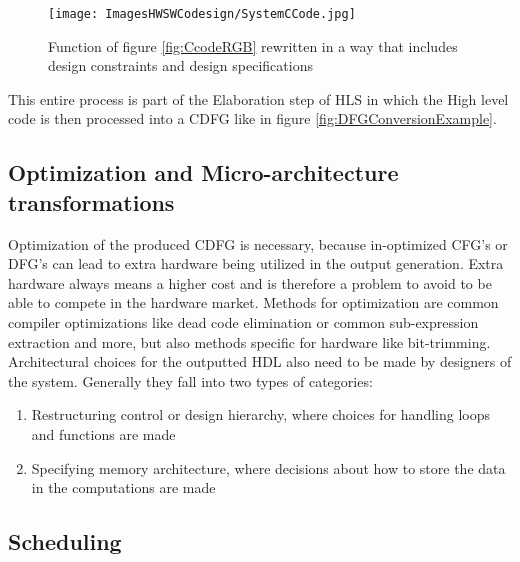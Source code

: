 \documentclass[conference]{IEEEtran}
\begin{document}
\begin{figure}[htbp]
    \centering
    \texttt{[image: ImagesHWSWCodesign/SystemCCode.jpg]}
    \caption{Function of figure \ref{fig:CcodeRGB} rewritten in a way that includes design constraints and design specifications}
    \label{fig:SystemCCode}
\end{figure}

This entire process is part of the Elaboration step of HLS in which the High level code is then processed into a CDFG like in figure \ref{fig:DFGConversionExample}\cite{ElectronicDesignAutomation}.

\subsection{Optimization and Micro-architecture transformations}

Optimization of the produced CDFG is necessary, because in-optimized CFG's or DFG's can lead to extra hardware being utilized in the output generation\cite{ElectronicDesignAutomation}. Extra hardware always means a higher cost and is therefore a problem to avoid to be able to compete in the hardware market\cite{ElectronicDesignAutomation}. Methods for optimization are common compiler optimizations like dead code elimination or common sub-expression extraction and more, but also methods specific for hardware like bit-trimming\cite{ElectronicDesignAutomation}.\\

Architectural choices for the outputted HDL also need to be made by designers of the system\cite{ElectronicDesignAutomation}. Generally they fall into two types of categories\cite{ElectronicDesignAutomation}:
\begin{enumerate}
    \item Restructuring control or design hierarchy, where choices for handling loops and functions are made\cite{ElectronicDesignAutomation}
    \item Specifying memory architecture, where decisions about how to store the data in the computations are made\cite{ElectronicDesignAutomation}
\end{enumerate}

\subsection{Scheduling}
\end{document}
